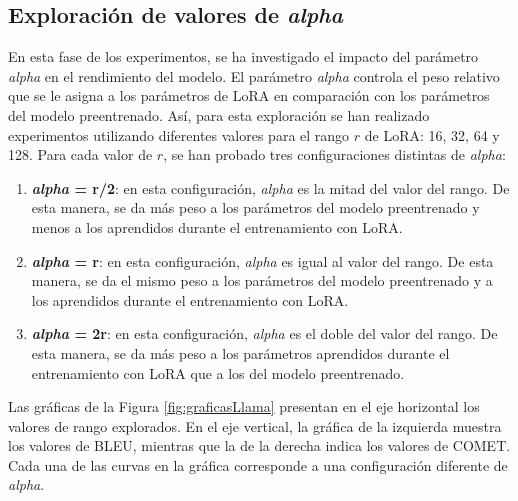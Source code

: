 \documentclass[11pt,spanish,listoffigures,listoftables]{tfgetsinf}
\begin{document}
\subsection{Exploración de valores de \textit{alpha}}

En esta fase de los experimentos, se ha investigado el impacto del parámetro \textit{alpha} en el rendimiento del modelo. El parámetro \textit{alpha} controla el peso relativo que se le asigna a los parámetros de LoRA en comparación con los parámetros del modelo preentrenado. Así, para esta exploración se han realizado experimentos utilizando diferentes valores para el rango $r$ de LoRA: 16, 32, 64 y 128. Para cada valor de $r$, se han probado tres configuraciones distintas de \textit{alpha}:

\begin{enumerate}
	\item \textbf{\textit{alpha} = r/2}: en esta configuración, \textit{alpha} es la mitad del valor del rango. De esta manera, se da más peso a los parámetros del modelo preentrenado y menos a los aprendidos durante el entrenamiento con LoRA.
	\item \textbf{\textit{alpha} = r}: en esta configuración, \textit{alpha} es igual al valor del rango. De esta manera, se da el mismo peso a los parámetros del modelo preentrenado y a los aprendidos durante el entrenamiento con LoRA.
	\item \textbf{\textit{alpha} = 2r}: en esta configuración, \textit{alpha} es el doble del valor del rango. De esta manera, se da más peso a los parámetros aprendidos durante el entrenamiento con LoRA que a los del modelo preentrenado.
\end{enumerate}

Las gráficas de la Figura \ref{fig:graficasLlama} presentan en el eje horizontal los valores de rango explorados. En el eje vertical, la gráfica de la izquierda muestra los valores de BLEU, mientras que la de la derecha indica los valores de COMET. Cada una de las curvas en la gráfica corresponde a una configuración diferente de \textit{alpha}. 
\end{document}
